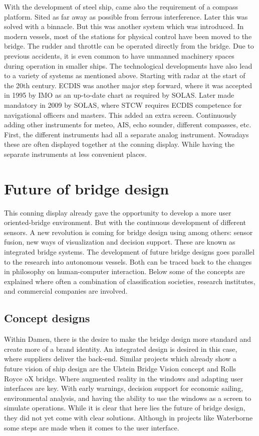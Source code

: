 With the development of steel ship, came also the requirement of a compass platform. Sited as far away as possible from ferrous interference. Later this was solved with a binnacle. But this was another system which was introduced. In modern vessels, most of the stations for physical control have been moved to the bridge. The rudder and throttle can be operated directly from the bridge. Due to previous accidents, it is even common to have unmanned machinery spaces during operation in smaller ships. The technological developments have also lead to a variety of systems as mentioned above. Starting with radar at the start of the 20th century. \ac{ECDIS} was another major step forward, where it was accepted in 1995 by IMO as an up-to-date chart as required by \ac{SOLAS}. Later made mandatory in 2009 by \ac{SOLAS}, where \ac{STCW} requires \ac{ECDIS} competence for navigational officers and masters. This added an extra screen. Continuously adding other instruments for meteo, \ac{AIS}, echo sounder, different compasses, etc. First, the different instruments had all a separate analog instrument. Nowadays these are often displayed together at the conning display. While having the separate instruments at less convenient places.

\section{Future of bridge design}
This conning display already gave the opportunity to develop a more user oriented-bridge environment. But with the continuous development of different sensors. A new revolution is coming for bridge design using among others: sensor fusion, new ways of visualization and decision support. These are known as integrated bridge systems.
The development of future bridge designs goes parallel to the research into autonomous vessels. Both can be traced back to the changes in philosophy on human-computer interaction. Below some of the concepts are explained where often a combination of classification societies, research institutes, and commercial companies are involved.

\subsection{Concept designs}
Within Damen, there is the desire to make the bridge design more standard and create more of a brand identity. An integrated design is desired in this case, where suppliers deliver the back-end. Similar projects which already show a future vision of ship design are the Ulstein Bridge Vision concept and Rolls Royce oX bridge. Where augmented reality in the windows and adapting user interfaces are key. With early warnings, decision support for economic sailing, environmental analysis, and having the ability to use the windows as a screen to simulate operations. While it is clear that here lies the future of bridge design, they did not yet come with clear solutions. Although in projects like Waterborne some steps are made when it comes to the user interface.\cite{RollsRoyce2015} \cite{Ulstein2013}

